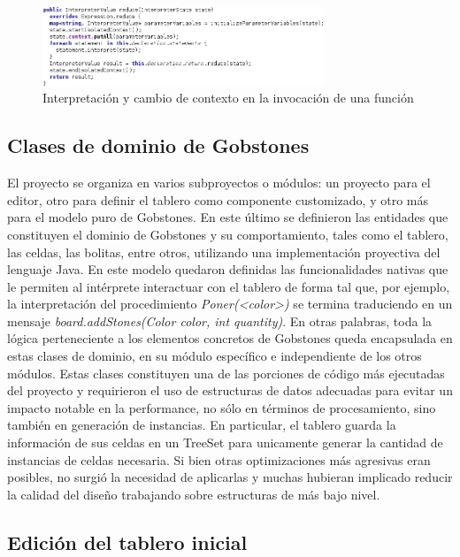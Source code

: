   \begin{figure}[h]
  \centering
  \includegraphics[width=0.75\textwidth]{assets/behavior_function_invocation}
  \caption{Interpretación y cambio de contexto en la invocación de una función}
  \label{fig:behavior_function_invocation}
  \end{figure}
  
\subsection{Clases de dominio de Gobstones}

El proyecto se organiza en varios subproyectos o módulos: un proyecto para el editor, otro para definir el tablero como componente customizado, y otro más para el modelo puro de Gobstones. En este último se definieron las entidades que constituyen el dominio de Gobstones y su comportamiento, tales como el tablero, las celdas, las bolitas, entre otros, utilizando una implementación proyectiva del lenguaje Java. En este modelo quedaron definidas las funcionalidades nativas que le permiten al intérprete interactuar con el tablero de forma tal que, por ejemplo, la interpretación del procedimiento \textit{Poner(<color>)} se termina traduciendo en un mensaje \textit{board.addStones(Color color, int quantity)}. En otras palabras, toda la lógica perteneciente a los elementos concretos de Gobstones queda encapsulada en estas clases de dominio, en su módulo específico e independiente de los otros módulos.
Estas clases constituyen una de las porciones de código más ejecutadas del proyecto y requirieron el uso de estructuras de datos adecuadas para evitar un impacto notable en la performance, no sólo en términos de procesamiento, sino también en generación de instancias. En particular, el tablero guarda la información de sus celdas en un TreeSet  para unicamente generar la cantidad de instancias de celdas necesaria. Si bien otras optimizaciones más agresivas eran posibles, no surgió la necesidad de aplicarlas y muchas hubieran implicado reducir la calidad del diseño trabajando sobre estructuras de más bajo nivel.

\subsection{Edición del tablero inicial}

